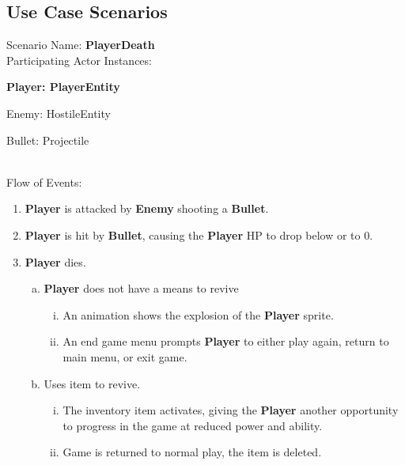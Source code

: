 \documentclass[12pt]{article}       %
\begin{document}
\subsection{Use Case Scenarios} 
Scenario Name: {\bf PlayerDeath} \\
Participating Actor Instances:        \hspace{46pt} {\bf Player: PlayerEntity

					          \hspace{2.6 in}   Enemy: HostileEntity 

					          \hspace{2.6in}    Bullet: Projectile} \vspace{10pt}  \\ 
Flow of Events: 
\begin{enumerate} 
\item {\bf Player} is attacked by {\bf Enemy} shooting a {\bf Bullet}.
\item {\bf Player} is hit by {\bf Bullet}, causing the {\bf Player} HP to drop below or to 0.
\item {\bf Player} dies.
      \begin{enumerate}[a.]
       \item {\bf Player} does not have a means to revive
                \begin{enumerate}[i.]
                 \item An animation shows the explosion of the {\bf Player} sprite.
                 \item An end game menu prompts {\bf Player} to either play again, return to main menu, or exit game.
                \end{enumerate}
       \item Uses item to revive.
                \begin{enumerate}[i.]
                \item The inventory item activates, giving the {\bf Player} another opportunity to progress in the game at reduced power and ability.
                \item Game is returned to normal play, the item is deleted. 
                \end{enumerate}
        \end{enumerate}
\end{enumerate}
\end{document}
